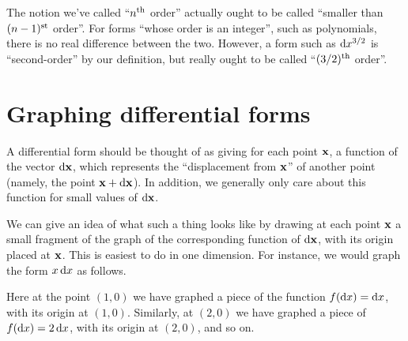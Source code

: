 \documentclass[12pt]{amsart}
\begin{document}
\begin{adv}
  The notion we've called ``$n^{\mathrm{th}}$ order'' actually ought to be called ``smaller than $(n-1)^{\mathrm{st}}$ order''.
  For forms ``whose order is an integer'', such as polynomials, there is no real difference between the two.
  However, a form such as $\mathrm{d} x^{3/2}$ is ``second-order'' by our definition, but really ought to be called ``$(3/2)^{\mathrm{th}}$ order''.
\end{adv}

\section{Graphing differential forms}
\label{sec:graphing-differential-forms}

A differential form should be thought of as giving for each point $\mathbf{x}$, a function of the vector $\mathrm{d} \mathbf{x}$, which represents the ``displacement from $\mathbf{x}$'' of another point (namely, the point $\mathbf{x}+\mathrm{d} \mathbf{x}$).
In addition, we generally only care about this function for small values of $\mathrm{d} \mathbf{x}$.

We can give an idea of what such a thing looks like by drawing at each point $\mathbf{x}$ a small fragment of the graph of the corresponding function of $\mathrm{d} \mathbf{x}$, with its origin placed at $\mathbf{x}$.
This is easiest to do in one dimension.
For instance, we would graph the form $x\,\mathrm{d} x$ as follows.
\begin{center}
\end{center}
Here at the point $(1,0)$ we have graphed a piece of the function $f(\mathrm{d} x) = \mathrm{d} x$, with its origin at $(1,0)$.
Similarly, at $(2,0)$ we have graphed a piece of $f(\mathrm{d} x) = 2\,\mathrm{d} x$, with its origin at $(2,0)$, and so on.
\end{document}
